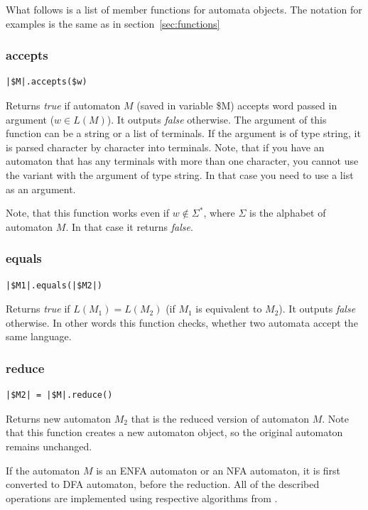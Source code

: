 \documentclass{ctuthesis}
\begin{document}
What follows is a list of member functions for automata objects. The notation for examples is the same as in section~\ref{sec:functions}

\subsubsection{accepts}
\begin{lstlisting}[language = JASL_snippet]
	|$M|.accepts($w)
\end{lstlisting}

Returns \textit{true} if automaton $M$ (saved in variable \$M) accepts word passed in argument ($w \in L(M)$). It outputs \textit{false} otherwise. The argument of this function can be a string or a list of terminals. If the argument is of type string, it is parsed character by character into terminals. Note, that if you have an automaton that has any terminals with more than one character, you cannot use the variant with the argument of type string. In that case you need to use a list as an argument.

Note, that this function works even if $w \not \in \Sigma^*$, where $\Sigma$ is the alphabet of automaton $M$. In that case it returns \textit{false}.

\subsubsection{equals}
\begin{lstlisting}[language = JASL_snippet]
	|$M1|.equals(|$M2|)
\end{lstlisting}

Returns \textit{true} if $L(M_1) = L(M_2)$ (if $M_1$ is equivalent to $M_2$). It outputs \textit{false} otherwise. In other words this function checks, whether two automata accept the same language. 

\subsubsection{reduce}
\begin{lstlisting}[language = JASL_snippet]
	|$M2| = |$M|.reduce()
\end{lstlisting}

Returns new automaton $M_2$ that is the reduced version of automaton $M$. Note that this function creates a new automaton object, so the original automaton remains unchanged. 

If the automaton $M$ is an ENFA automaton or an NFA automaton, it is first converted to DFA automaton, before the reduction. All of the described operations are implemented using respective algorithms from \cite{demlova}.
\end{document}
